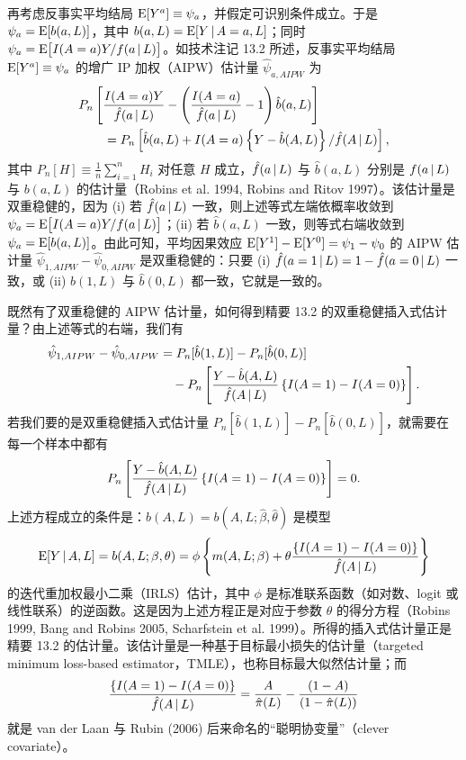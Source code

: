 \renewcommand{\TPname}{技术注记（Technical Point）}
\begin{techpoint}[增广 IP 加权估计量与双重稳健插入式估计量的关系]
再考虑反事实平均结局 $\mathrm{E}[Y^{a}]\equiv\psi_a$，并假定可识别条件成立。于是 $\psi_a=\mathrm{E}[b(a,L)]$，其中 $b(a,L)=\mathrm{E}[Y\,|\, A=a,L]$；同时 $\psi_a=\mathrm{E}\bigl[I(A=a)Y/f(a\,|\, L)\bigr]$。如技术注记 13.2 所述，反事实平均结局 $\mathrm{E}[Y^{a}]\equiv\psi_a$ 的增广 IP 加权（AIPW）估计量 $\hat\psi_{a,AIPW}$ 为
\begin{align*}
&P_n\left[\frac{I(A=a)Y}{\hat f(a\,|\, L)}-\left(\frac{I(A=a)}{\hat f(a\,|\, L)}-1\right)\hat b(a,L)\right]\\
&\qquad=P_n\left[\hat b(a,L)+I(A=a)\left\{Y-\hat b(A,L)\right\}/\hat f(A\,|\, L)\right],
\end{align*}
其中 $P_n[H]\equiv\frac{1}{n}\sum_{i=1}^{n}H_i$ 对任意 $H$ 成立，$\hat f(a\,|\, L)$ 与 $\hat b(a,L)$ 分别是 $f(a\,|\, L)$ 与 $b(a,L)$ 的估计量（Robins et al. 1994, Robins and Ritov 1997）。该估计量是双重稳健的，因为 (i) 若 $\hat f(a\,|\, L)$ 一致，则上述等式左端依概率收敛到 $\psi_a=\mathrm{E}\bigl[I(A=a)Y/f(a\,|\, L)\bigr]$；(ii) 若 $\hat b(a,L)$ 一致，则等式右端收敛到 $\psi_a=\mathrm{E}[b(a,L)]$。由此可知，平均因果效应 $\mathrm{E}[Y^{1}]-\mathrm{E}[Y^{0}]=\psi_1-\psi_0$ 的 AIPW 估计量 $\hat\psi_{1,AIPW}-\hat\psi_{0,AIPW}$ 是双重稳健的：只要 (i) $\hat f(a=1\,|\, L)=1-\hat f(a=0\,|\, L)$ 一致，或 (ii) $\hat b(1,L)$ 与 $\hat b(0,L)$ 都一致，它就是一致的。

既然有了双重稳健的 AIPW 估计量，如何得到精要 13.2 的双重稳健插入式估计量？由上述等式的右端，我们有
\begin{align*}
\hat\psi_{1,AIPW}-\hat\psi_{0,AIPW}
&=P_n[\hat b(1,L)]-P_n[\hat b(0,L)]\\
&\quad-P_n\left[\frac{Y-\hat b(A,L)}{\hat f(A\,|\, L)}\left\{I(A=1)-I(A=0)\right\}\right].
\end{align*}
若我们要的是双重稳健插入式估计量 $P_n[\hat b(1,L)]-P_n[\hat b(0,L)]$，就需要在每一个样本中都有
\[
P_n\left[\frac{Y-\hat b(A,L)}{\hat f(A\,|\, L)}\left\{I(A=1)-I(A=0)\right\}\right]=0.
\]
上述方程成立的条件是：$\hat b(A,L)=b(A,L;\hat\beta,\hat\theta)$ 是模型
\[
\mathrm{E}[Y\,|\, A,L]=b(A,L;\beta,\theta)=\phi\left\{m(A,L;\beta)+\theta\frac{\left\{I(A=1)-I(A=0)\right\}}{\hat f(A\,|\, L)}\right\}
\]
的迭代重加权最小二乘（IRLS）估计，其中 $\phi$ 是标准联系函数（如对数、logit 或线性联系）的逆函数。这是因为上述方程正是对应于参数 $\theta$ 的得分方程（Robins 1999, Bang and Robins 2005, Scharfstein et al. 1999）。所得的插入式估计量正是精要 13.2 的估计量。该估计量是一种基于目标最小损失的估计量（targeted minimum loss-based estimator，TMLE），也称目标最大似然估计量；而
\[
\frac{\{I(A=1)-I(A=0)\}}{\hat f(A\,|\, L)}=\frac{A}{\hat\pi(L)}-\frac{(1-A)}{(1-\hat\pi(L))}
\]
就是 van der Laan 与 Rubin (2006) 后来命名的“聪明协变量”（clever covariate）。


\end{techpoint}
